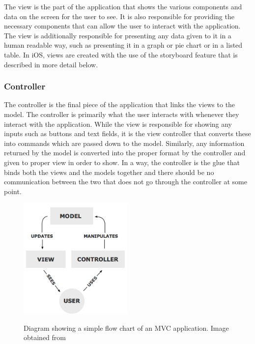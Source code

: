 \documentclass[12pt,a4paper]{report}
\begin{document}
The view is the part of the application that shows the various components and data on the screen for the user to see. It is also responsible for providing the necessary components that can allow the user to interact with the application. The view is additionally responsible for presenting any data given to it in a human readable way, such as presenting it in a graph or pie chart or in a listed table. In iOS, views are created with the use of the storyboard feature that is described in more detail below.

\subsubsection{Controller}

The controller is the final piece of the application that links the views to the model. The controller is primarily what the user interacts with whenever they interact with the application. While the view is responsible for showing any inputs such as buttons and text fields, it is the view controller that converts these into commands which are passed down to the model. Similarly, any information returned by the model is converted into the proper format by the controller and given to proper view in order to show. In a way, the controller is the glue that binds both the views and the models together and there should be no communication between the two that does not go through the controller at some point.

\begin{figure}[]
\centering
\includegraphics[width=0.5\textwidth]{images-implementation/MVCLayout.png}
\label{MVC}
\caption{Diagram showing a simple flow chart of an MVC application. Image obtained from \cite{mvc}}
\end{figure}
\end{document}
